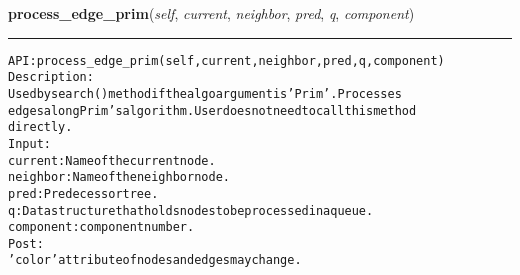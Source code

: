     \label{coinor:gimpy:graph:Graph:process_edge_prim}

    \vspace{0.5ex}

\hspace{.8\funcindent}\begin{boxedminipage}{\funcwidth}

    \raggedright \textbf{process\_edge\_prim}(\textit{self}, \textit{current}, \textit{neighbor}, \textit{pred}, \textit{q}, \textit{component})

    \vspace{-1.5ex}

    \rule{\textwidth}{0.5\fboxrule}
\setlength{\parskip}{2ex}
\begin{alltt}

API: process\_edge\_prim(self, current, neighbor, pred, q, component)
Description:
Used by search() method if the algo argument is 'Prim'. Processes
edges along Prim's algorithm. User does not need to call this method
directly.
Input:
    current: Name of the current node.
    neighbor: Name of the neighbor node.
    pred: Predecessor tree.
    q: Data structure that holds nodes to be processed in a queue.
    component: component number.
Post:
    'color' attribute of nodes and edges may change.
\end{alltt}

\setlength{\parskip}{1ex}
    \end{boxedminipage}

    \label{coinor:gimpy:graph:Graph:process_edge_search}

    \vspace{0.5ex}

